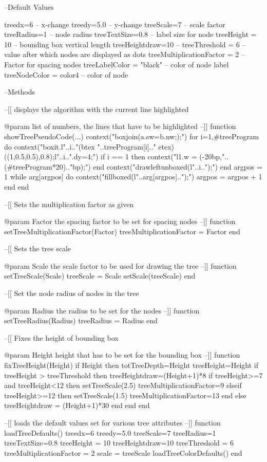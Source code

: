 \startluacode
--Default Values

treedx=6 			-- x-change
treedy=5.0			-- y-change
treeScale=7			-- scale factor
treeRadius=1			-- node radius
treeTextSize=0.8		-- label size for node
treeHeight = 10			-- bounding box vertical length
treeHeightdraw=10		-- 
treeThreshold = 6		-- value after which nodes are displayed as dots
treeMultiplicationFactor = 2	-- Factor for spacing nodes
treeLabelColor = "black"	-- color of node label
treeNodeColor = color4		-- color of node


--Methods

--[[
displays the algorithm with the current line highlighted

@param list of numbers, the lines that have to be highlighted
--]]
function showTreePseudoCode(...)				
	context("boxjoin(a.sw=b.nw;);")
	for i=1,#treeProgram do
		context("boxit.l"..i.."(btex "..treeProgram[i].."  etex)((1,0.5,0.5),0.8);l"..i..".dy=4;")
		if i == 1 then
			context("l1.w = (-20bp,"..(#treeProgram*20).."bp);")
		end
		context("drawleftunboxed(l"..i..");")
	end
	argpos = 1
	while arg[argpos] do  
		context("fillboxed(l"..arg[argpos]..");")
		argpos = argpos + 1
	end 
end


--[[
Sets the multiplication factor as given

@param Factor the spacing factor to be set for spacing nodes
--]]
function setTreeMultiplicationFactor(Factor)
	treeMultiplicationFactor = Factor
end

--[[
Sets the tree scale

@param Scale the scale factor to be used for drawing the tree
--]]
function setTreeScale(Scale)
	treeScale = Scale
	setScale(treeScale)
end

--[[
Set the node radius of nodes in the tree

@param Radius the radius to be set for the nodes
--]]
function setTreeRadius(Radius)
	treeRadius = Radius
end

--[[
Fixes the height of bounding box

@param Height height that has to be set for the bounding box
--]]
function fixTreeHeight(Height)
	if Height then
		totTreeDepth=Height
		treeHeight=Height
		if treeHeight > treeThreshold then
			treeHeightdraw=(Height+1)*8
			if treeHeight>=7 and treeHeight<12 then
				setTreeScale(2.5)
				treeMultiplicationFactor=9
			elseif treeHeight>=12 then
				setTreeScale(1.5)
				treeMultiplicationFactor=13
			end
		else
			treeHeightdraw = (Height+1)*30
		end
	end
end

--[[
loads the default values set for various tree attributes
--]]
function loadTreeDefaults()
	treedx=6
	treedy=5.0
	treeScale=7
	treeRadius=1
	treeTextSize=0.8
	treeHeight = 10
	treeHeightdraw=10
	treeThreshold = 6
	treeMultiplicationFactor = 2
	scale = treeScale
	loadTreeColorDefaults()
end

